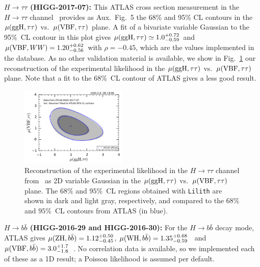 
{\bf\boldmath $H\to \tau\tau$ (HIGG-2017-07):} This ATLAS cross section measurement in the $H\to \tau\tau$ channel~\cite{Aaboud:2018pen} 
provides as Aux.~Fig.~5 the 68\% and 95\% CL contours in the $\mu({\rm ggH}, \tau\tau)$ vs.\ $\mu({\rm VBF}, \tau\tau)$ plane. 
A fit of a bivariate variable Gaussian to the 95\%~CL contour in this plot  
gives $\mu({\rm ggH}, \tau\tau)\simeq 1.0^{+0.72}_{-0.59}$ and $\mu({\rm VBF}, WW)=1.20^{+0.62}_{-0.56}$ with 
$\rho = -0.45$, which are the values implemented in the database. As no other validation material is available, 
we show in Fig.~\ref{fig:validation_atlas_tautau} our reconstruction of the experimental likelihood in the 
$\mu({\rm ggH}, \tau\tau)$ vs.\ $\mu({\rm VBF}, \tau\tau)$ plane. 
Note that a fit to the 68\%~CL contour of ATLAS gives a less good result. \\

\begin{figure}[h!]\centering
\includegraphics[width=0.45\textwidth]{validation/ATLAS/HIGG-2017-07-mu-2d.pdf}
\caption{Reconstruction of the experimental likelihood in the $H\to \tau\tau$ channel from~\cite{Aaboud:2018pen} 
as 2D variable Gaussian in the $\mu({\rm ggH}, \tau\tau)$ vs.\ $\mu({\rm VBF}, \tau\tau)$ plane. 
The  $68\%$ and $95\%$~CL regions obtained with {\tt Lilith} are shown in dark and light gray, respectively, 
and compared to the $68\%$ and  $95\%$~CL contours from ATLAS (in blue).}
\label{fig:validation_atlas_tautau}
\end{figure}


{\bf\boldmath $H\to b\bar b$ (HIGG-2016-29 and HIGG-2016-30):} For the $H\to b\bar b$ decay mode, ATLAS gives 
$\mu({\rm ZH}, b\bar b) = 1.12^{+0.50}_{-0.45}$, $\mu({\rm WH}, b\bar b) = 1.35^{+0.68}_{-0.59}$~\cite{Aaboud:2018gay} 
and $\mu({\rm VBF}, b\bar b) = 3.0^{+1.7}_{-1.6}$~\cite{Aaboud:2018gay}. 
No correlation data is available, so we implemented each of these as a 1D result; 
a Poisson likelihood is assumed per default. \\

